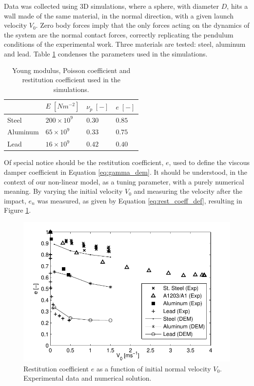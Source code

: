 Data was collected using 3D simulations, where a sphere, with diameter $D$, hits a wall made of the same material, in the normal direction, with a given launch velocity $V_0$. Zero body forces imply that the only forces acting on the dynamics of the system are the normal contact forces, correctly replicating the pendulum conditions of the experimental work. Three materials are tested: steel, aluminum and lead. Table \ref{tab:material_props} condenses the parameters used in the simulations.
%
\begin{table}[h]
\centering
\begin{tabular}{l|lll}
 & $E\;[Nm^{-2}]$ & $\nu_p\;[-]$  & $e\;[-]$ \\ \hline
Steel & $200\times10^9$ & $0.30$ & $0.85$ \\
Aluminum & $65\times10^9$ & $0.33$ & $0.75$ \\
Lead & $16\times10^9$ & $0.42$ & $0.40$
\end{tabular}
\caption{Young modulus, Poisson coefficient and restitution coefficient used in the simulations.}
\label{tab:material_props}
\end{table}
%

Of special notice should be the restitution coefficient, $e$, used to define the viscous damper coefficient in Equation \eqref{eq:gamma_dem}. It should be understood, in the context of our non-linear model, as a tuning parameter, with a purely numerical meaning. By varying the initial velocity $V_0$ and measuring the velocity after the impact, $e_n$ was measured, as given by Equation \eqref{eq:rest_coeff_def}, resulting in Figure \ref{fig:Restitution_coeff_dem}.

%
\begin{figure}[ht!]
	\centering
	\includegraphics[width=0.70\linewidth]{Figures/5.Chapter/e_vo_DEM}
	\caption{Restitution coefficient $e$ as a function of initial normal velocity $V_0$. Experimental data \citep{Kruggel-Emden-2007} and numerical solution.}
	\label{fig:Restitution_coeff_dem} 
\end{figure}
%

